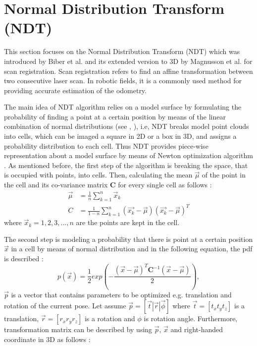 \section{Normal Distribution Transform (NDT)}\label{sec:ndt}
This section focuses on the Normal Distribution Transform (NDT) which was introduced by Biber et al. \cite{2dndt} and its extended version to 3D by Magnusson et al. \cite{3dndt} for scan registration. Scan registration refers to find an affine transformation between two consecutive laser scan. In robotic fields, it is a commonly used method for providing accurate estimation of the odometry.%
\par The main idea of NDT algorithm relies on a model surface by formulating the probability of finding a point at a certain position by means of the linear combination of normal distributions (see \cite{2dndt}, \cite{3dndt}), i.e, NDT breaks model point clouds into cells, which can be imaged a square in 2D or a box in 3D, and assigns a probability distribution to each cell. Thus NDT provides piece-wise representation about a model surface by means of Newton optimization algorithm \cite{2dndt}.
As mentioned before, the first step of the algorithm is breaking the space, that is occupied with points, into cells. Then, calculating the mean $\vec \mu$ of the point in the cell  and its co-variance matrix \textbf{C} for every single cell as follows \cite{2dndt}:
\begin{align}
    \vec \mu &= \frac{1}{n}\sum_{k=1}^n \vec x_k\\
    C &=\frac{1}{1-n}\sum_{k=1}^n(\vec{x_k}-\vec{\mu})(\vec{x_k} -\vec{\mu})^T
\end{align}
where $\vec x_k=1,2,3,...,n$ are the points are kept in the cell. 
\par The second step is modeling a probability that there is point at a certain position $\vec x$ in a cell by means of normal distribution and in the following equation, the \acrfull{pdf} is described \cite{3dndt}:
\begin{equation}
p(\vec x)=\frac{1}{2}exp(-\frac{(\vec{x}-\vec{\mu})^T\textbf{C}^{-1}(\vec{x}-\vec{\mu})}{2}),
\end{equation}
$\vec{p}$ is a vector that contains parameters to be optimized e.g. translation and rotation of the current pose. Let assume $\vec p=[\vec t | \vec r | \vec \phi ]$ where $\vec{t}=[t_x t_y t_z]$ is a translation, $\vec{r}=[r_x r_y r_z]$ is a rotation and $\phi$ is rotation angle. Furthermore, transformation matrix can be described by using $\vec{p}$, $\vec{x}$ and right-handed coordinate in 3D as follows \cite{3dndt}:
